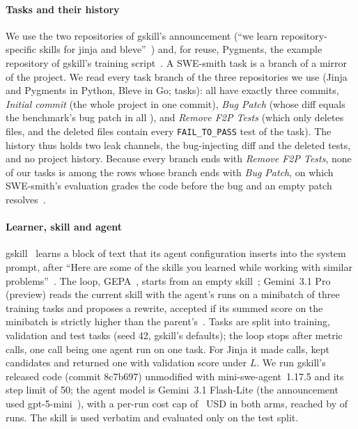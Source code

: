 \documentclass[sigconf,review,anonymous]{acmart}
\newcommand{\agentmodel}{Gemini~3.1 Flash-Lite}
\newcommand{\promodel}{Gemini~3.1 Pro (preview)}
\begin{document}
\paragraph{Tasks and their history}
We use the two repositories of gskill's announcement (``we learn repository-specific skills for
jinja and bleve''~\cite{gskill}) and, for reuse, Pygments, the example repository of gskill's
training script~\cite{gskill_train_config}. A SWE-smith task is a branch of a mirror of the project. We read every task branch of the three
repositories we use (Jinja and Pygments in Python, Bleve in Go; \nhiTasks{} tasks): all
\nhiThree{} have exactly three commits, \emph{Initial commit} (the whole project in one commit),
\emph{Bug Patch} (whose diff equals the benchmark's bug patch in all \nhiBugEq{}), and \emph{Remove
F2P Tests} (which only deletes files, and the deleted files contain every \texttt{FAIL\_TO\_PASS}
test of the task). The history thus holds two leak channels, the bug-injecting diff and the deleted
tests, and no project history. Because every branch ends with \emph{Remove F2P Tests}, none of our
tasks is among the rows whose branch ends with \emph{Bug Patch}, on which SWE-smith's evaluation
grades the code before the bug and an empty patch resolves~\cite{swesmith_issue_252}.

\paragraph{Learner, skill and agent}
gskill~\cite{gskill} learns a block of text that its agent configuration inserts into the system
prompt, after ``Here are some of the skills you learned while working with similar
problems''~\cite{gskill_mini_yaml}. The loop, GEPA~\cite{gepa_paper_abs,gskill_train_config}, starts from an empty
skill~\cite{gskill_train_config}; \promodel{} reads the current skill with the agent's runs on a
minibatch of three training tasks and proposes a rewrite, accepted if its summed score on the
minibatch is strictly higher than the parent's~\cite{gepa_acceptance}. Tasks are split into
\nlearnTrain{} training, \nlearnVal{} validation and \nlearnTest{} test tasks (seed 42, gskill's
defaults); the loop stops after \nlearnBudget{} metric calls, one call being one agent run on one
task. For Jinja it made \nlearnCalls{} calls, kept \nlearnCands{} candidates and returned one with
validation score \nlearnValL{} under $L$. We run gskill's released code (commit 8c7b697) unmodified
with mini-swe-agent~1.17.5 and its step limit of 50; the agent model is \agentmodel{} (the
announcement used gpt-5-mini~\cite{gskill}), with a per-run cost cap of \nswsCapLimit{}~USD in both
arms, reached by \nswsCapped{} of \nswsRuns{} runs. The skill is used verbatim and evaluated only
on the test split.
\end{document}
